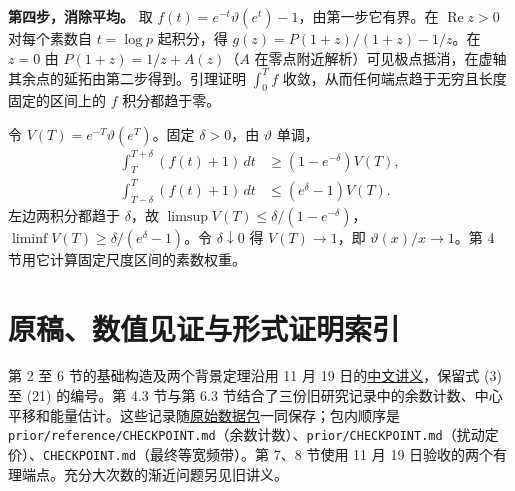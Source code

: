 \documentclass[11pt,a4paper]{article}
\newcommand{\repoentry}[2]{\href{https://github.com/woznickiainslie141-dot/pi-polynomial-values-lean/blob/97a3bf152c993cf260448baf40f6c8322708af06/#1}{#2}}
\begin{document}
\textbf{第四步，消除平均。} 取 \(f(t)=e^{-t}\vartheta(e^t)-1\)，由第一步它有界。在 \(\operatorname{Re}z>0\) 对每个素数自 \(t=\log p\) 起积分，得 \(g(z)=P(1+z)/(1+z)-1/z\)。在 \(z=0\) 由 \(P(1+z)=1/z+A(z)\)（\(A\) 在零点附近解析）可见极点抵消，在虚轴其余点的延拓由第二步得到。引理证明 \(\int_0^T f\) 收敛，从而任何端点趋于无穷且长度固定的区间上的 \(f\) 积分都趋于零。

令 \(V(T)=e^{-T}\vartheta(e^T)\)。固定 \(\delta>0\)，由 \(\vartheta\) 单调， \[
 \begin{aligned}
 \int_T^{T+\delta}(f(t)+1)\,dt&\ge(1-e^{-\delta})V(T),\\
 \int_{T-\delta}^T(f(t)+1)\,dt&\le(e^\delta-1)V(T).
 \end{aligned}
\] 左边两积分都趋于 \(\delta\)，故 \(\limsup V(T)\le\delta/(1-e^{-\delta})\)，\(\liminf V(T)\ge\delta/(e^\delta-1)\)。令 \(\delta\downarrow0\) 得 \(V(T)\to1\)，即 \(\vartheta(x)/x\to1\)。第 4 节用它计算固定尺度区间的素数权重。

\section{原稿、数值见证与形式证明索引}
第 2 至 6 节的基础构造及两个背景定理沿用 11 月 19 日的\repoentry{paper/background/2026-11-19/polynomial-values-zh.tex}{中文讲义}，保留式 (3) 至 (21) 的编号。第 4.3 节与第 6.3 节结合了三份旧研究记录中的余数计数、中心平移和能量估计。这些记录随\repoentry{research/pi_cross_constant_2026-11-18/base-checkpoint.zip}{原始数据包}一同保存；包内顺序是 \texttt{prior/reference/CHECKPOINT.md}（余数计数）、\texttt{prior/CHECKPOINT.md}（扰动定价）、\texttt{CHECKPOINT.md}（最终等宽频带）。第 7、8 节使用 11 月 19 日验收的两个有理端点。充分大次数的渐近问题另见旧讲义。
\end{document}
